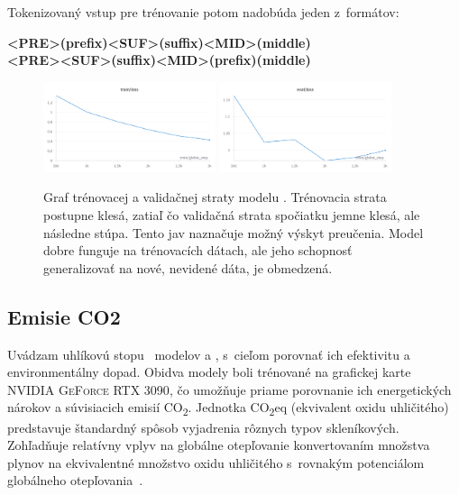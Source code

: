 \noindent Tokenizovaný vstup pre trénovanie potom nadobúda jeden z~formátov:
\begin{center}
    \textbf{<PRE>(prefix)<SUF>(suffix)<MID>(middle)}\\
    \textbf{<PRE><SUF>(suffix)<MID>(prefix)(middle)}
\end{center}

\begin{figure}[!ht]
    \centering
    \includegraphics[width=0.45\textwidth]{obrazky/MicroCoderFIM-TL.png}
    \includegraphics[width=0.45\textwidth]{obrazky/MicorCoderFIM-EL.png}
    \caption{Graf trénovacej a validačnej straty modelu \MCfim{}. Trénovacia strata postupne klesá, zatiaľ čo validačná strata spočiatku jemne klesá, ale následne stúpa. Tento jav naznačuje možný výskyt preučenia. Model dobre funguje na trénovacích dátach, ale jeho schopnosť generalizovať na nové, nevidené dáta, je obmedzená.}
    \label{fig:MicroCoderFIMFTGraphs}
\end{figure}

\subsection{Emisie CO2}

 Uvádzam uhlíkovú stopu~\cite{lacoste2019quantifying} modelov \MC{} a \MCfim{}, s~cieľom porovnať ich efektivitu a environmentálny dopad. Obidva modely boli trénované na grafickej karte \textsc{NVIDIA GeForce RTX 3090}, čo umožňuje priame porovnanie ich energetických nárokov a súvisiacich emisií CO\textsubscript{2}. Jednotka CO\textsubscript{2}eq (ekvivalent oxidu uhličitého) predstavuje štandardný spôsob vyjadrenia rôznych typov skleníkových. Zohľadňuje relatívny vplyv na globálne otepľovanie konvertovaním množstva plynov na ekvivalentné množstvo oxidu uhličitého s~rovnakým potenciálom globálneho otepľovania~\cite{EEAGlossary2023}.

